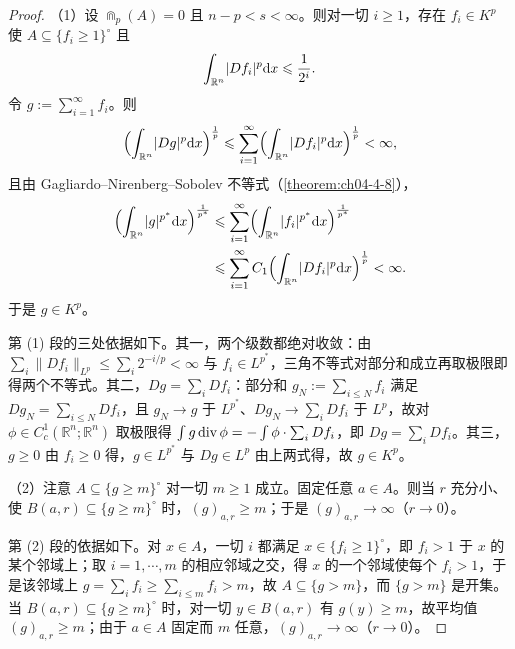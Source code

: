 \documentclass[../../main.tex]{subfiles}%
\begin{document}
\begin{proof}
（1）设 $\Cap_p(A)=0$ 且 $n-p<s<\infty$。则对一切 $i\geqslant1$，存在 $f_i\in K^p$ 使 $A\subseteq\{f_i\geqslant1\}^{\circ}$ 且
\begin{align*}
\int_{\mathbb{R}^n}\lvert Df_i\rvert^p\mathrm{d} x\leqslant\frac{1}{2^i}.
\end{align*}
令 $g:=\sum_{i=1}^{\infty}f_i$。则
\begin{align*}
\Bigl(\int_{\mathbb{R}^n}\lvert Dg\rvert^p\mathrm{d} x\Bigr)^{\frac1p}\leqslant\sum_{i=1}^{\infty}\Bigl(\int_{\mathbb{R}^n}\lvert Df_i\rvert^p\mathrm{d} x\Bigr)^{\frac1p}<\infty ,
\end{align*}
且由 Gagliardo--Nirenberg--Sobolev 不等式（\cref{theorem:ch04-4-8}），%
\begin{align*}
\Bigl(\int_{\mathbb{R}^n}\lvert g\rvert^{p^*}\mathrm{d} x\Bigr)^{\frac{1}{p^*}}&\leqslant\sum_{i=1}^{\infty}\Bigl(\int_{\mathbb{R}^n}\lvert f_i\rvert^{p^*}\mathrm{d} x\Bigr)^{\frac{1}{p^*}}\\
&\leqslant\sum_{i=1}^{\infty}C_1\Bigl(\int_{\mathbb{R}^n}\lvert Df_i\rvert^p\mathrm{d} x\Bigr)^{\frac1p}<\infty .
\end{align*}
于是 $g\in K^p$。

第 (1) 段的三处依据如下。其一，两个级数都绝对收敛：由 $\sum_i\lVert Df_i\rVert_{L^p}\leqslant\sum_i2^{-i/p}<\infty$ 与 $f_i\in L^{p^*}$，三角不等式对部分和成立再取极限即得两个不等式。其二，$Dg=\sum_iDf_i$：部分和 $g_N:=\sum_{i\leqslant N}f_i$ 满足 $Dg_N=\sum_{i\leqslant N}Df_i$，且 $g_N\to g$ 于 $L^{p^*}$、$Dg_N\to\sum_iDf_i$ 于 $L^p$，故对 $\phi\in C_c^1(\mathbb{R}^n;\mathbb{R}^n)$ 取极限得 $\int g\operatorname{div}\phi=-\int\phi\cdot\sum_iDf_i$，即 $Dg=\sum_iDf_i$。其三，$g\geqslant0$ 由 $f_i\geqslant0$ 得，$g\in L^{p^*}$ 与 $Dg\in L^p$ 由上两式得，故 $g\in K^p$。

（2）注意 $A\subseteq\{g\geqslant m\}^{\circ}$ 对一切 $m\geqslant1$ 成立。固定任意 $a\in A$。则当 $r$ 充分小、使 $B(a,r)\subseteq\{g\geqslant m\}^{\circ}$ 时，$(g)_{a,r}\geqslant m$；于是 $(g)_{a,r}\to\infty$（$r\to0$）。

第 (2) 段的依据如下。对 $x\in A$，一切 $i$ 都满足 $x\in\{f_i\geqslant1\}^{\circ}$，即 $f_i>1$ 于 $x$ 的某个邻域上；取 $i=1,\cdots,m$ 的相应邻域之交，得 $x$ 的一个邻域使每个 $f_i>1$，于是该邻域上 $g=\sum_i f_i\geqslant\sum_{i\leqslant m}f_i>m$，故 $A\subseteq\{g>m\}$，而 $\{g>m\}$ 是开集。当 $B(a,r)\subseteq\{g\geqslant m\}^{\circ}$ 时，对一切 $y\in B(a,r)$ 有 $g(y)\geqslant m$，故平均值 $(g)_{a,r}\geqslant m$；由于 $a\in A$ 固定而 $m$ 任意，$(g)_{a,r}\to\infty$（$r\to0$）。


\end{proof}
\end{document}
